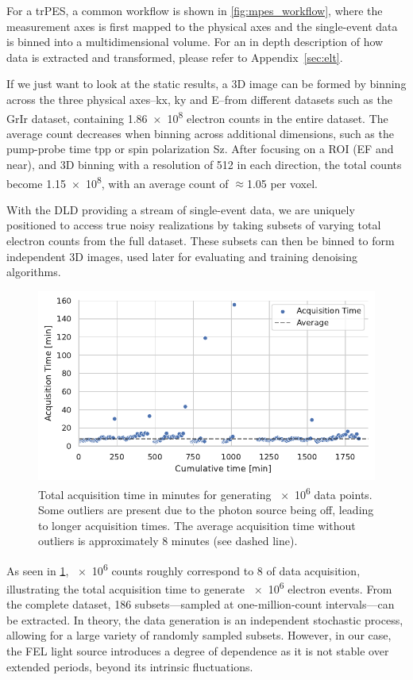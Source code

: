 For a \gls{trPES}, a common workflow is shown in \cref{fig:mpes_workflow}, where the measurement axes is first mapped to the  physical axes and the single-event data is binned into a multidimensional volume. For an in depth description of how data is extracted and transformed, please refer to Appendix~\ref{sec:elt}.

If we just want to look at the static results, a 3D image can be formed by binning across the three physical axes--\gls{kx}, \gls{ky} and \gls{E}--from different datasets such as the \gls{GrIr} dataset, containing \num{1.86e8} electron counts in the entire dataset. The average count decreases when binning across additional dimensions, such as the pump-probe time \gls{tpp} or spin polarization \gls{Sz}. After focusing on a \gls{ROI} (\gls{EF} and near), and 3D binning with a resolution of \num{512} in each direction, the total counts become \num{1.15e8}, with an average count of $\approx$1.05 per voxel. 

With the \gls{DLD} providing a stream of single-event data, we are uniquely positioned to access true noisy realizations by taking subsets of varying total electron counts from the full dataset. These subsets can then be binned to form independent 3D images, used later for evaluating and training denoising algorithms.

\begin{figure}
    \centering
    \includegraphics[width=0.8\linewidth]{images/acq_time_1M.pdf}
    \caption{Total acquisition time in minutes for generating \num{e6} data points. Some outliers are present due to the photon source being off, leading to longer acquisition times. The average acquisition time without outliers is approximately 8 minutes (see dashed line).}
    \label{fig:acq-time-1M}
\end{figure}


As seen in \cref{fig:acq-time-1M}, \num{e6} counts roughly correspond to \qty{8}{\min} of data acquisition, illustrating the total acquisition time to generate \num{e6} electron events. From the complete dataset, \num{186} subsets—sampled at one-million-count intervals—can be extracted. In theory, the data generation is an independent stochastic process, allowing for a large variety of randomly sampled subsets. However, in our case, the \gls{FEL} light source introduces a degree of dependence as it is not stable over extended periods, beyond its intrinsic fluctuations.



